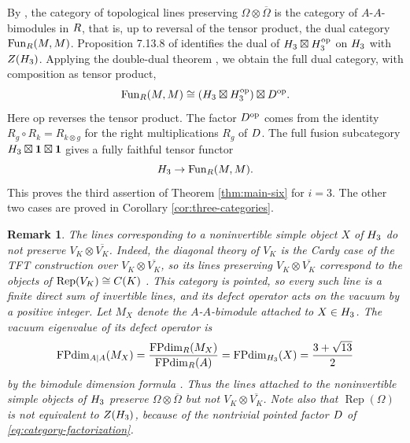\documentclass[leqno]{article}
\let\cal\relax
\newcommand{\cal}{\mathcal}
\newcommand{\ot}{\otimes}
\DeclareMathOperator{\Rep}{Rep}
\newtheorem{remark}[thm]{Remark}
\numberwithin{equation}{section}
\begin{document}
By \cite{FFRS07}, the category of topological lines preserving $\Omega \ot \overline\Omega$ is the category of $A$-$A$-bimodules in $\cal R$, that is, up to reversal of the tensor product, the dual category $\operatorname{Fun}_{\cal R}(\cal M,\cal M)$. Proposition 7.13.8 of \cite[p.~163]{EGNO15} identifies the dual of $\cal H_3 \boxtimes \cal H_3^{\mathrm{op}}$ on $\cal H_3$ with $Z(\cal H_3)$. Applying the double-dual theorem \cite[Theorem 7.12.11 pp.~156--157]{EGNO15}, we obtain the full dual category, with composition as tensor product,
\[
\operatorname{Fun}_{\cal R}(\cal M,\cal M) \cong (\cal H_3 \boxtimes \cal H_3^{\mathrm{op}}) \boxtimes \cal D^{\mathrm{op}}.
\]
Here $\mathrm{op}$ reverses the tensor product. The factor $\cal D^{\mathrm{op}}$ comes from the identity $R_g \circ R_k = R_{k \ot g}$ for the right multiplications $R_g$ of $\cal D$. The full fusion subcategory $\cal H_3 \boxtimes \mathbf 1 \boxtimes \mathbf 1$ gives a fully faithful tensor functor
\begin{equation}
\label{eq:line-inclusion}
\cal H_3 \to \operatorname{Fun}_{\cal R}(\cal M,\cal M).
\end{equation}
This proves the third assertion of Theorem \ref{thm:main-six} for $i = 3$. The other two cases are proved in Corollary \ref{cor:three-categories}.

\begin{remark}\normalfont
\label{rem:VK-lines}
The lines corresponding to a noninvertible simple object $X$ of $\cal H_3$ do not preserve $V_K \ot \overline{V_K}$. Indeed, the diagonal theory of $V_K$ is the Cardy case of the TFT construction over $V_K \ot \overline{V_K}$, so its lines preserving $V_K \ot \overline{V_K}$ correspond to the objects of $\Rep(V_K) \cong \cal C(K)$ \cite{FFRS07}. This category is pointed, so every such line is a finite direct sum of invertible lines, and its defect operator acts on the vacuum by a positive integer. Let $M_X$ denote the $A$-$A$-bimodule attached to $X \in \cal H_3$. The vacuum eigenvalue of its defect operator is
\[
\operatorname{FPdim}_{A|A}(M_X)
= \frac{\operatorname{FPdim}_{\cal R}(M_X)}{\operatorname{FPdim}_{\cal R}(A)}
= \operatorname{FPdim}_{\cal H_3}(X)
= \frac{3+\sqrt{13}}{2}
\]
by the bimodule dimension formula \cite{FFRS07}. Thus the lines attached to the noninvertible simple objects of $\cal H_3$ preserve $\Omega \ot \overline\Omega$ but not $V_K \ot \overline{V_K}$. Note also that $\Rep(\Omega)$ is not equivalent to $Z(\cal H_3)$, because of the nontrivial pointed factor $\cal D$ of \eqref{eq:category-factorization}.
\end{remark}
\end{document}
